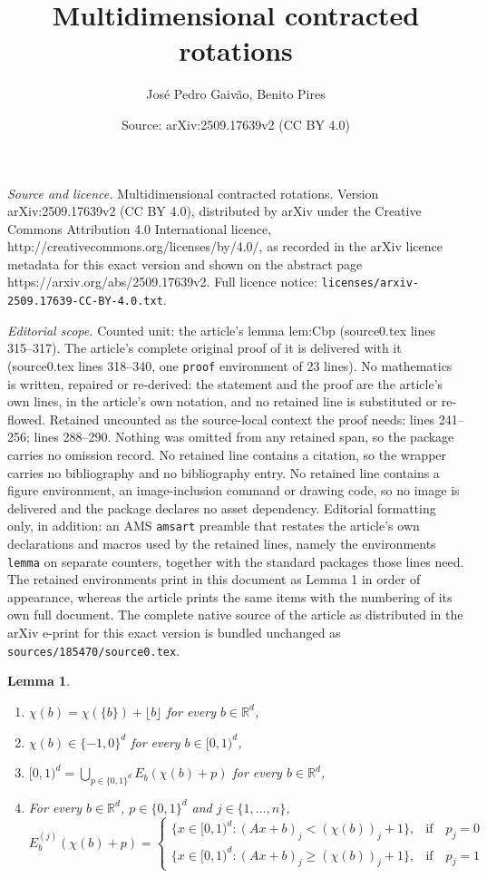 \documentclass[10pt,a4paper]{amsart}
\title{Multidimensional contracted rotations}
\author{Jos\'e Pedro Gaiv\~ao, Benito Pires}
\date{Source: arXiv:2509.17639v2 (CC BY 4.0)}
\newtheorem{lemma}{Lemma}
\newcommand{\Rr}{\mathbb{R}}
\begin{document}
\maketitle

\noindent\emph{Source and licence.} Multidimensional contracted rotations. Version arXiv:2509.17639v2 (CC BY 4.0), distributed by arXiv under the Creative Commons Attribution 4.0 International licence, http://creativecommons.org/licenses/by/4.0/, as recorded in the arXiv licence metadata for this exact version and shown on the abstract page https://arxiv.org/abs/2509.17639v2. Full licence notice: \texttt{licenses/arxiv-2509.17639-CC-BY-4.0.txt}.\par\smallskip

\noindent\textit{Editorial scope.} Counted unit: the article's lemma lem:Cbp (source0.tex lines 315--317). The article's complete original proof of it is delivered with it (source0.tex lines 318--340, one \texttt{proof} environment of 23 lines). No mathematics is written, repaired or re-derived: the statement and the proof are the article's own lines, in the article's own notation, and no retained line is substituted or re-flowed.  Retained uncounted as the source-local context the proof needs: lines 241--256; lines 288--290.  Nothing was omitted from any retained span, so the package carries no omission record.  No retained line contains a citation, so the wrapper carries no bibliography and no bibliography entry.  No retained line contains a figure environment, an image-inclusion command or drawing code, so no image is delivered and the package declares no asset dependency.  Editorial formatting only, in addition: an AMS \texttt{amsart} preamble that restates the article's own declarations and macros used by the retained lines, namely the environments \texttt{lemma} on separate counters, together with the standard packages those lines need.  The retained environments print in this document as Lemma 1 in order of appearance, whereas the article prints the same items with the numbering of its own full document.  The complete native source of the article as distributed in the arXiv e-print for this exact version is bundled unchanged as \texttt{sources/185470/source0.tex}.
\begin{lemma}\label{lem:chi}
\hfill
\begin{enumerate}
\item $\chi(b)=\chi(\{b\})+\lfloor b\rfloor$ for every $b\in\Rr^d$,
\item $\chi(b)\in\{-1,0\}^d$ for every $b\in[0,1)^d$,
\item $[0,1)^d = \bigcup_{p\in\{0,1\}^d} E_b(\chi(b)+p)$ for every $b\in\Rr^d$,
\item For every $b\in\Rr^d$, $p\in\{0,1\}^d$ and ${j\in\{1,\ldots,n\}}$,
$$
E_b^{{(j)}}(\chi(b)+p)=
\begin{cases}
\{x\in[0,1)^d\colon  (Ax+b)_{{j}}<(\chi(b))_{{j}}+1\},& {\textrm{if}}\quad p_j=0\\
\{x\in[0,1)^d\colon  (Ax+b)_{{j}}\geq (\chi(b))_{{j}}+1\},& {\textrm{if}}\quad p_j=1
\end{cases}
$$
\end{enumerate}
\end{lemma}
\end{document}
